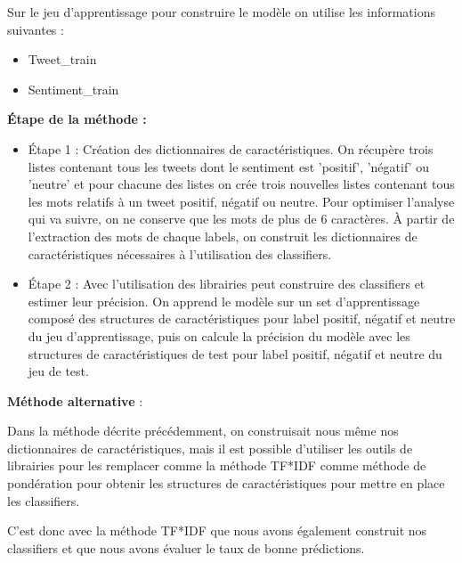 \par Sur le jeu d'apprentissage pour construire le modèle on utilise les informations suivantes : \\
\begin{itemize}
	\item Tweet\_train
	\item Sentiment\_train \\
\end{itemize}


\par \textbf{Étape de la méthode :} \\
\begin{itemize}
	\item Étape 1 : Création des dictionnaires de caractéristiques. On récupère trois listes contenant tous les tweets dont le sentiment est 'positif', 'négatif' ou 'neutre' et pour chacune des listes on crée trois nouvelles listes contenant tous les mots relatifs à un tweet positif, négatif ou neutre. Pour optimiser l'analyse qui va suivre, on ne conserve que les mots de plus de 6 caractères. À partir de l'extraction des mots de chaque labels, on construit les dictionnaires de caractéristiques nécessaires à l'utilisation des classifiers. \\
	\item Étape 2 : Avec l'utilisation des librairies peut construire des classifiers et estimer leur précision. On apprend le modèle sur un set d'apprentissage composé des structures de caractéristiques pour label positif, négatif et neutre du jeu d'apprentissage, puis on calcule la précision du modèle avec les structures de caractéristiques de test pour label positif, négatif et neutre du jeu de test. \\
\end{itemize}

\par \textbf{Méthode alternative }: \\
\par Dans la méthode décrite précédemment, on construisait nous même nos dictionnaires de caractéristiques, mais il est possible d'utiliser les outils de librairies pour les remplacer comme la méthode TF*IDF comme méthode de pondération pour obtenir les structures de caractéristiques pour mettre en place les classifiers.
\par C'est donc avec la méthode TF*IDF que nous avons également construit nos classifiers et que nous avons évaluer le taux de bonne prédictions. \\

